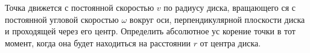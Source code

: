  Точка движется с постоянной скоростью $v$ по радиусу диска, вращающего
 ся с постоянной угловой скоростью $\omega$ вокруг оси, перпендикулярной
 плоскости диска и проходящей через его центр. Определить абсолютное ус
 корение точки в тот момент, когда она будет находиться на расстоянии
 $r$ от центра диска.
